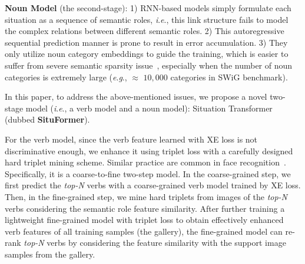 \documentclass[letterpaper]{article} %
\newcommand{\ie}{\textit{i}.\textit{e}.}
\newcommand{\eg}{\textit{e}.\textit{g}.}
\begin{document}

\noindent\textbf{Noun Model} (the second-stage): 1) RNN-based models simply formulate each situation as a sequence of semantic roles, \ie, this link structure fails to model the complex relations between different semantic roles. 2) This autoregressive sequential prediction manner is prone to result in error accumulation. 3) They only utilize noun category embeddings to guide the training, which is easier to suffer from severe semantic sparsity issue~\cite{yatskar2017commonly}, especially when the number of noun categories is extremely large (\eg, $\approx$ $10,000$ categories in SWiG benchmark).


In this paper, to address the above-mentioned issues, we propose a novel two-stage model (\ie, a verb model and a noun model): Situation Transformer (dubbed \textbf{SituFormer}).

For the verb model, since the verb feature learned with XE loss is not discriminative enough, we enhance it using triplet loss with a carefully designed hard triplet mining scheme. Similar practice are common in face recognition~\cite{schroff2015facenet,wen2016discriminative}. Specifically, it is a coarse-to-fine two-step model. In the coarse-grained step, we first predict the \emph{top-N} verbs with a coarse-grained verb model trained by XE loss. Then, in the fine-grained step, we mine hard triplets from images of the \emph{top-N} verbs considering the semantic role feature similarity. After further training a lightweight fine-grained model with triplet loss to obtain effectively enhanced verb features of all training samples (the gallery), the fine-grained model can re-rank \emph{top-N} verbs by considering the feature similarity with the support image samples from the gallery.


\end{document}
